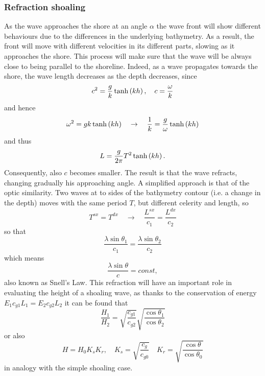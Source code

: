\subsubsection*{Refraction shoaling}
As the wave approaches the shore at an angle $\alpha$ the wave front will show different behaviours due to the differences in the underlying bathymetry. As a result, the front will move with different velocities in its different parts, slowing as it approaches the shore. This process will make sure that the wave will be always close to being parallel to the shoreline. Indeed, as a wave propagates towards the shore, the wave length decreases as the depth decreases, since
\begin{equation*}
c^{2}=\dfrac{g}{k}\tanh\left( kh \right),\quad c=\dfrac{\omega}{k}
\end{equation*}
and hence 
\begin{equation*}
\omega^{2}=gk\tanh\left( kh \right) \quad \rightarrow \quad \dfrac{1}{k}=\dfrac{g}{\omega}\tanh\left( kh \right) 
\end{equation*}
and thus
\begin{equation}
L=\dfrac{g}{2\pi}T^{2}\tanh\left( kh \right).
\end{equation}
Consequently, also $c$ becomes smaller. The result is that the wave refracts, changing gradually his approaching angle. A simplified approach is that of the optic similarity. Two waves at to sides of the bathymetry contour (i.e. a change in the depth) moves with the same period $T$, but different celerity and length, so
\begin{equation*}
T^{sx}=T^{dx} \quad \rightarrow \quad \dfrac{L^{sx}}{c_{1}}=\dfrac{L^{dx}}{c_{2}}
\end{equation*}
so that
\begin{equation*}
\dfrac{\lambda\sin\theta_{1}}{c_{1}}=\dfrac{\lambda\sin\theta_{2}}{c_{2}}
\end{equation*}
which means
\begin{equation}
\dfrac{\lambda\sin\theta}{c}=const,
\end{equation}
also known as Snell's Law. This refraction will have an important role in evaluating the height of a shoaling wave, as thanks to the conservation of energy $E_{1}c_{g1}L_{1}=E_{2}c_{g2}L_{2}$ it can be found that
\begin{equation}
\dfrac{H_{1}}{H_{2}}=\sqrt{\dfrac{c_{g1}}{c_{g2}}}\sqrt{\dfrac{\cos\theta_{1}}{\cos\theta_{2}}}
\end{equation}
or also
\begin{equation}
H=H_{0}K_{s}K_{r}, \quad K_{s}=\sqrt{\dfrac{c_{g}}{c_{g0}}} \quad K_{r}=\sqrt{\dfrac{\cos\theta}{\cos\theta_{0}}}
\end{equation}
in analogy with the simple shoaling case.
